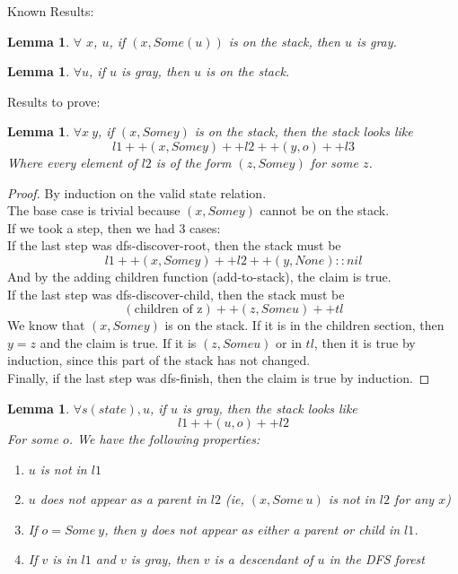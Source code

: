 \documentclass{article}
\newtheorem{lemma}[theorem]{Lemma}
\begin{document}
Known Results:
\begin{lemma}
$\forall$ $x$, $u$, if $(x, Some(u))$ is on the stack, then $u$ is gray.
\end{lemma}
\begin{lemma}
$\forall u$, if $u$ is gray, then $u$ is on the stack.
\end{lemma}
Results to prove:
\begin{lemma}
$\forall x~y$, if $(x, Some y)$ is on the stack, then the stack looks like
\[l1 ++ (x, Some y) ++ l2 ++ (y, o) ++ l3\]
Where every element of $l2$ is of the form $(z, Some y)$ for some $z$.
\end{lemma}
\begin{proof}
By induction on the valid state relation.
\\The base case is trivial because $(x, Some y)$ cannot be on the stack.
\\If we took a step, then we had 3 cases:
\\If the last step was dfs-discover-root, then the stack must be
\[l1 ++ (x, Some y) ++ l2 ++ (y, None) :: nil\]
And by the adding children function (add-to-stack), the claim is true.
\\If the last step was dfs-discover-child, then the stack must be
\[(\text{children of z}) ++ (z, Some u) ++ tl\]
We know that $(x, Some y)$ is on the stack. If it is in the children section, then $y=z$ and the claim is true. If it is $(z, Some u)$ or in $tl$, then it is true by induction, since this part of the stack has not changed.
\\Finally, if the last step was dfs-finish, then the claim is true by induction.
\end{proof}
\begin{lemma}
$\forall s (state), u$, if $u$ is gray, then the stack looks like
\[l1 ++ (u, o) ++ l2\]
For some $o$. We have the following properties:
\begin{enumerate}
\item
$u$ is not in $l1$
\item
$u$ does not appear as a parent in $l2$ (ie, $(x,Some~u)$ is not in $l2$ for any $x$)
\item
If $o=Some~y$, then $y$ does not appear as either a parent or child in $l1$.
\item
If $v$ is in $l1$ and $v$ is gray, then $v$ is a descendant of $u$ in the DFS forest
\end{enumerate}
\end{lemma}
\end{document}
